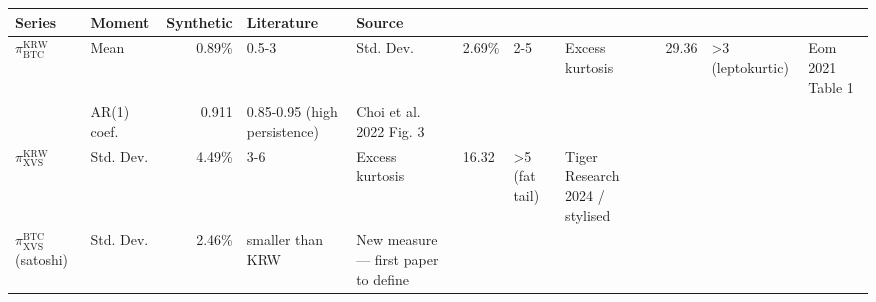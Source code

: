 \begin{tabular}{llrll}
\toprule
Series & Moment & Synthetic & Literature & Source \\
\midrule
$\pi^{\text{KRW}}_{\text{BTC}}$ & Mean & 0.89\% & 0.5-3%
 & Std. Dev. & 2.69\% & 2-5%
 & Excess kurtosis & 29.36 & >3 (leptokurtic) & Eom 2021 Table 1 \\
 & AR(1) coef. & 0.911 & 0.85-0.95 (high persistence) & Choi et al. 2022 Fig. 3 \\
\midrule
$\pi^{\text{KRW}}_{\text{XVS}}$ & Std. Dev. & 4.49\% & 3-6%
 & Excess kurtosis & 16.32 & >5 (fat tail) & Tiger Research 2024 / stylised \\
\midrule
$\pi^{\text{BTC}}_{\text{XVS}}$ (satoshi) & Std. Dev. & 2.46\% & smaller than KRW & New measure — first paper to define \\
\bottomrule
\end{tabular}